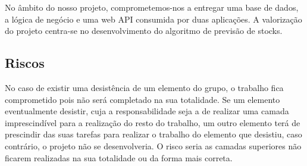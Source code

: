 No âmbito do nosso projeto, comprometemos-nos a entregar uma base de dados, a lógica de negócio e uma web API consumida por duas aplicações. A valorização do projeto centra-se no desenvolvimento do algoritmo de previsão de stocks.

\subsection*{Riscos}
No caso de existir uma desistência de um elemento do grupo, o trabalho fica comprometido pois não será completado na sua totalidade. Se um elemento eventualmente desistir, cuja a responsabilidade seja a de realizar uma camada imprescindível para a realização do resto do trabalho, um outro elemento terá de prescindir das suas tarefas para realizar o trabalho do elemento que desistiu, caso contrário, o projeto não se desenvolveria. O risco seria as camadas superiores não ficarem realizadas na sua totalidade ou da forma mais correta.